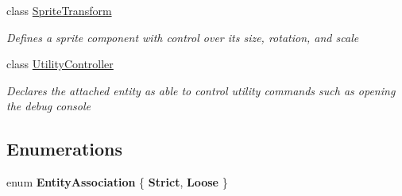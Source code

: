 \begin{DoxyCompactItemize}
class \hyperlink{class_midnight_blue_1_1_engine_1_1_entity_component_1_1_sprite_transform}{Sprite\+Transform}
\begin{DoxyCompactList}\small\item\em Defines a sprite component with control over its size, rotation, and scale \end{DoxyCompactList}\item 
class \hyperlink{class_midnight_blue_1_1_engine_1_1_entity_component_1_1_utility_controller}{Utility\+Controller}
\begin{DoxyCompactList}\small\item\em Declares the attached entity as able to control utility commands such as opening the debug console \end{DoxyCompactList}\end{DoxyCompactItemize}
\subsection*{Enumerations}
\begin{DoxyCompactItemize}
\item 
\hypertarget{namespace_midnight_blue_1_1_engine_1_1_entity_component_af0aab6f6be85d47f4524c7138358047e}{}\label{namespace_midnight_blue_1_1_engine_1_1_entity_component_af0aab6f6be85d47f4524c7138358047e} 
enum {\bfseries Entity\+Association} \{ {\bfseries Strict}, 
{\bfseries Loose}
 \}
\end{DoxyCompactItemize}
